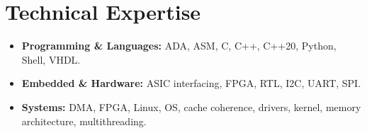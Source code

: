 \documentclass[9pt,a4paper]{article}
\begin{document}
\section*{Technical Expertise}
\begin{tcolorbox}[mybox]
\begin{itemize}
\item \textbf{Programming \& Languages:} ADA, ASM, C, C++, C++20, Python, Shell, VHDL.

\item \textbf{Embedded \& Hardware:} ASIC interfacing, FPGA, RTL, I2C, UART, SPI.

\item \textbf{Systems:} DMA, FPGA, Linux, OS, cache coherence, drivers, kernel, memory architecture, multithreading.
\end{itemize}
\end{tcolorbox}
\end{document}
